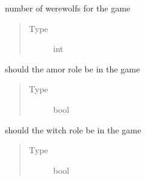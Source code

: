 \documentclass[letterpaper,10pt,english]{sphinxmanual}
\begin{document}
\begin{fulllineitems}

\begin{fulllineitems}
\label{\detokenize{chatwolf:chatwolf.game.Game.numwerewolfs}}
number of werewolfs for the game
\begin{quote}\begin{description}
\item[{Type}] \leavevmode
int

\end{description}\end{quote}

\end{fulllineitems}


\begin{fulllineitems}
\label{\detokenize{chatwolf:chatwolf.game.Game.amor}}
should the amor role be in the game
\begin{quote}\begin{description}
\item[{Type}] \leavevmode
bool

\end{description}\end{quote}

\end{fulllineitems}


\begin{fulllineitems}
\label{\detokenize{chatwolf:chatwolf.game.Game.witch}}
should the witch role be in the game
\begin{quote}\begin{description}
\item[{Type}] \leavevmode
bool

\end{description}\end{quote}

\end{fulllineitems}



\end{fulllineitems}
\end{document}
